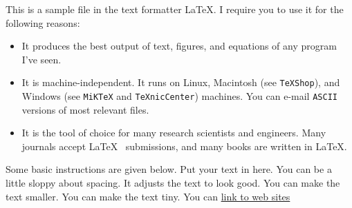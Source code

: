 \documentclass{article}
\begin{document}

\medskip
This is a sample file in the text formatter \LaTeX.
I require you to use it for the following reasons:

\begin{itemize}

\item{It produces the best output of text, figures,
      and equations of any
      program I've seen.}

\item{It is machine-independent. It runs on Linux, Macintosh (see {\tt TeXShop}), and Windows (see {\tt MiKTeX} and {\tt TeXnicCenter}) machines.
     You can e-mail {\tt ASCII} versions of most relevant files.}

\item{It is the tool of choice for many research
     scientists and engineers.
     Many journals accept 
     \LaTeX~ submissions, and many books
     are written in \LaTeX.}

\end{itemize}
\medskip
Some basic instructions are given below.
Put your text in here.  You can be a little sloppy    about
spacing.  It adjusts the text to look good.
{\small You can make the text smaller.}
{\tiny You can make the text tiny.}
You can \href{http://www.nd.edu/~powers/ame.20214}{link to web sites}
\end{document}

